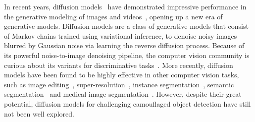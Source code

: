 \documentclass{ecai}
\begin{document}
In recent years, diffusion models~\cite{ho2020denoising} have demonstrated impressive performance in the generative modeling of images and videos~\cite{dhariwal2021diffusion}, opening up a new era of generative models. Diffusion models are a class of generative models that consist of Markov chains trained using variational inference, to denoise noisy images blurred by Gaussian noise via learning the reverse diffusion process. Because of its powerful noise-to-image denoising pipeline, the computer vision community is curious about its variants for discriminative tasks~\cite{croitoru2023diffusion}. More recently, diffusion models have been found to be highly effective in other computer vision tasks, such as image editing~\cite{hertz2022prompt}, super-resolution~\cite{li2022srdiff}, instance segmentation~\cite{gu2022diffusioninst}, semantic segmentation~\cite{baranchuk2021label, brempong2022denoising} and medical image segmentation~\cite{aimon2023ambiguous, wu2022medsegdiff}. However, despite their great potential, diffusion models for challenging camouflaged object detection have still not been well explored. 




\end{document}
